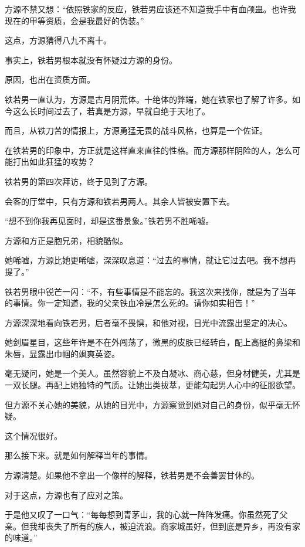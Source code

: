 
\begin{this_body}



方源不禁又想：“依照铁家的反应，铁若男应该还不知道我手中有血颅蛊。也许我现在的甲等资质，会是我最好的伪装。”

这点，方源猜得八九不离十。

事实上，铁若男根本就没有怀疑过方源的身份。

原因，也出在资质方面。

铁若男一直认为，方源是古月阴荒体。十绝体的弊端，她在铁家也了解了许多。如今这么长时间过去了，若真是方源，早就自绝于天地了。

而且，从铁刀苦的情报上，方源勇猛无畏的战斗风格，也算是一个佐证。

在铁若男的印象中，方正就是这样直来直往的性格。而方源那样阴险的人，怎么可能打出如此狂猛的攻势？

铁若男的第四次拜访，终于见到了方源。

会客的厅堂中，只有方源和铁若男两人。其余人皆被安置下去。

“想不到你我再见面时，却是这番景象。”铁若男不胜唏嘘。

方源和方正是胞兄弟，相貌酷似。

她唏嘘，方源比她更唏嘘，深深叹息道：“过去的事情，就让它过去吧。我不想再提了。”

铁若男眼中锐芒一闪：“不，有些事情是不能忘的。我这次来找你，就是为了当年的事情。你一定知道，我的父亲铁血冷是怎么死的。请你如实相告！”

方源深深地看向铁若男，后者毫不畏惧，和他对视，目光中流露出坚定的决心。

她剑眉星目，这些年许是不在外闯荡了，微黑的皮肤已经转白，配上高挺的鼻梁和朱唇，显露出巾帼的飒爽英姿。

毫无疑问，她是一个美人。虽然容貌上不及白凝冰、商心慈，但身材健美，尤其是一双长腿。再配上她独特的气质。让她出类拔萃，更能勾起男人心中的征服欲望。

但方源不关心她的美貌，从她的目光中，方源察觉到她对自己的身份，似乎毫无怀疑。

这个情况很好。

那么接下来。就是如何解释当年的事情。

方源清楚。如果他不拿出一个像样的解释，铁若男是不会善罢甘休的。

对于这点，方源也有了应对之策。

于是他又叹了一口气：“每每想到青茅山，我的心就一阵阵发痛。你虽然死了父亲。但我却丧失了所有的族人，被迫流浪。商家城虽好，但到底是异乡，再没有家的味道。”


\end{this_body}
